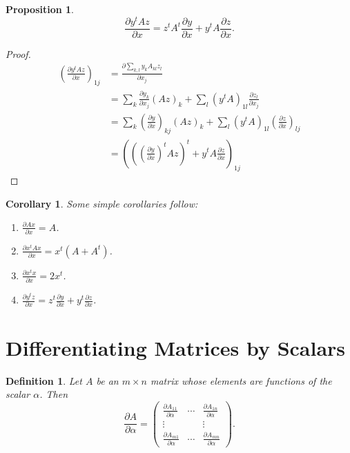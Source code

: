 \documentclass{article}
\theoremstyle{plain}
\newtheorem{proposition}[theorem]{Proposition}
\newtheorem{corollary}[theorem]{Corollary}
\newtheorem{definition}[theorem]{Definition}
\newcommand{\diff}[2]{\frac{\partial {#1}}{\partial {#2}}}
\begin{document}
\begin{proposition}
\begin{equation}
\diff{y^t A z}{x} = z^t A^t \diff{y}{x} + y^t A \diff{z}{x}.
\end{equation}
\end{proposition}
\begin{proof}
\begin{equation*}
\begin{split}
\left( \diff{y^t A z}{x}\right)_{1j} &= \diff{\sum_{k, l} y_k A_{kl} z_l}{x_j} \\
	&= \sum_k  \diff{y_k}{x_j} (A z)_k + \sum_l (y^t A)_{1l} \diff{z_l}{x_j} \\
	&= \sum_k \left(\diff{y}{x}\right)_{kj} (A z)_k + \sum_l (y^t A)_{1l} \left(\diff{z}{x}\right)_{lj} \\
	&= \left( \left( \left( \diff{y}{x} \right)^t A z \right)^t+ y^t A \diff{z}{x} \right)_{1j}
\end{split}
\end{equation*}
\end{proof}

\begin{corollary}
Some simple corollaries follow:
\begin{enumerate}
\item $\diff{A x}{x} = A$.
\item $\diff{x^t A x}{x} = x^t(A + A^t)$.
\item $\diff{x^t x}{x} = 2 x^t$.
\item $\diff{y^t z}{x} = z^t \diff{y}{x} + y^t \diff{z}{x}$.
\end{enumerate}
\end{corollary}


\section{Differentiating Matrices by Scalars}

\begin{definition}
Let $A$ be an $m \times n$ matrix whose elements are functions of the scalar $\alpha$. Then
\begin{equation}
\diff{A}{\alpha} = \begin{pmatrix}
\diff{A_{11}}{\alpha} & \cdots & \diff{A_{1n}}{\alpha} \\
\vdots & & \vdots \\
\diff{A_{m1}}{\alpha} & \cdots & \diff{A_{mn}}{\alpha}
\end{pmatrix}.
\end{equation}
\end{definition}
\end{document}
